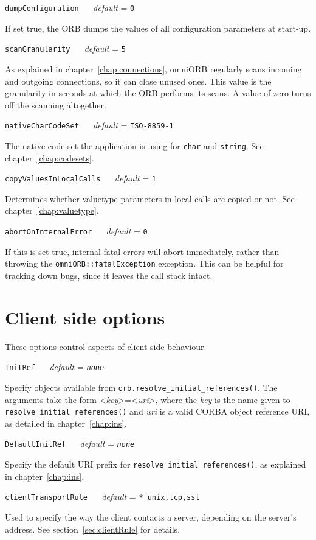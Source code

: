 \documentclass[11pt,twoside,a4paper]{book}
\makeatletter
\newcommand{\type}[1]{\texttt{#1}}
\newcommand{\code}[1]{\texttt{#1}}
\newcommand{\op}[1]{\texttt{#1()}}
\newcommand{\confopt}[2]
  {\vspace{\baselineskip}\par\noindent\code{#1} ~~ \textit{default} =
   \code{#2}}
\renewcommand{\confopt}[2]
  {\vspace{\baselineskip}\par\noindent\code{#1} ~~ \textit{default} =
   \code{#2}\\[-1ex]\@afterheading}
\newcommand{\dsc}{\discretionary{}{}{}}
\makeatother
\begin{document}
\confopt{dumpConfiguration}{0}

If set true, the ORB dumps the values of all configuration parameters
at start-up.


\confopt{scanGranularity}{5}

As explained in chapter~\ref{chap:connections}, omniORB regularly
scans incoming and outgoing connections, so it can close unused
ones. This value is the granularity in seconds at which the ORB
performs its scans. A value of zero turns off the scanning altogether.


\confopt{nativeCharCodeSet}{ISO-8859-1}

The native code set the application is using for \type{char} and
\type{string}. See chapter~\ref{chap:codesets}.


\confopt{copyValuesInLocalCalls}{1}

Determines whether valuetype parameters in local calls are copied or
not. See chapter~\ref{chap:valuetype}.


\confopt{abortOnInternalError}{0}

If this is set true, internal fatal errors will abort immediately,
rather than throwing the \type{omniORB::fatalException} exception.
This can be helpful for tracking down bugs, since it leaves the call
stack intact.


\section{Client side options}

These options control aspects of client-side behaviour.


\confopt{InitRef}{\textit{none}}

Specify objects available from
\op{orb.resolve\_initial\_references}. The arguments take the form
<\textit{key}>=<\textit{uri}>, where the \textit{key} is the name
given to \op{resolve\_\dsc{}initial\_\dsc{}references} and
\textit{uri} is a valid CORBA object reference URI, as detailed in
chapter~\ref{chap:ins}.


\confopt{DefaultInitRef}{\textit{none}}

Specify the default URI prefix for
\op{resolve\_\dsc{}initial\_\dsc{}references}, as explained in
chapter~\ref{chap:ins}.


\confopt{clientTransportRule}{* unix,tcp,ssl}

Used to specify the way the client contacts a server, depending on the
server's address. See section~\ref{sec:clientRule} for details.
\end{document}
